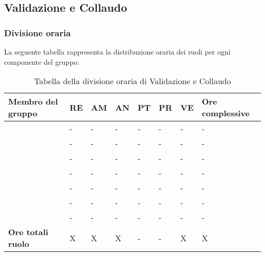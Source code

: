 \subsection{Validazione e Collaudo}

\subsubsection{Divisione oraria}
La seguente tabella rappresenta la distribuzione oraria dei ruoli per ogni componente del gruppo:
{

\renewcommand{\arraystretch}{2}
\begin{longtable}[h!] { C{4cm} C{1cm} C{1cm} C{1cm} C{1cm} C{1cm} C{1cm} C{3cm}}
\caption{Tabella della divisione oraria di Validazione e Collaudo}	\\
\rowcolor{\primaryColor}

\textcolor{\secondaryColor}{\textbf{Membro del gruppo}} & 
\textcolor{\secondaryColor}{\textbf{RE}} & 
\textcolor{\secondaryColor}{\textbf{AM}} & 
\textcolor{\secondaryColor}{\textbf{AN}} & 
\textcolor{\secondaryColor}{\textbf{PT}} & 
\textcolor{\secondaryColor}{\textbf{PR}} & 
\textcolor{\secondaryColor}{\textbf{VE}} & 
\textcolor{\secondaryColor}{\textbf{Ore complessive}}\\	
\endhead

\AD{}                     &  - &  - &  - & - & - & - & - \\
\AT{}                     &  - &  - &  - & - & - & - & - \\
\AW{}                     &  - &  - &  - & - & - & - & - \\
\EC{}                     &  - &  - &  - & - & - & - & - \\
\EM{}                     &  - &  - &  - & - & - & - & - \\
\FP{}                     &  - &  - &  - & - & - & - & - \\
\GG{}                     &  - &  - &  - & - & - & - & - \\
\textbf{Ore totali ruolo} & X & X & X & - & - & X & X \\

\end{longtable}
}


